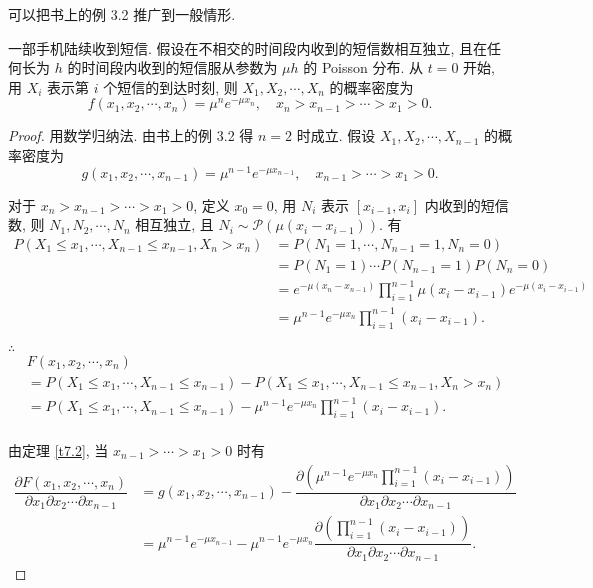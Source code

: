 \documentclass[color=black,device=normal,lang=cn]{elegantnote}
\numberwithin{equation}{section}
\theoremstyle{plain}
\numberwithin{exercise}{exsection}
\begin{document}
可以把书上的例 3.2 推广到一般情形.
\begin{example}\label{exa7.5}
    一部手机陆续收到短信. 假设在不相交的时间段内收到的短信数相互独立, 且在任何长为 $h$ 的时间段内收到的短信服从参数为 $\mu h$ 的 Poisson 分布. 从 $t=0$ 开始, 用 $X_i$ 表示第 $i$ 个短信的到达时刻, 则 $X_1,X_2,\cdots,X_n$ 的概率密度为
    \[f(x_1,x_2,\cdots,x_n)=\mu^ne^{-\mu x_n},\quad x_n>x_{n-1}>\cdots>x_1>0.\]
\end{example}
\begin{proof}
    用数学归纳法. 由书上的例 3.2 得 $n=2$ 时成立. 假设 $X_1,X_2,\cdots,X_{n-1}$ 的概率密度为
    \[g(x_1,x_2,\cdots,x_{n-1})=\mu^{n-1}e^{-\mu x_{n-1}},\quad x_{n-1}>\cdots>x_1>0.\]

    对于 $x_n>x_{n-1}>\cdots>x_1>0$, 定义 $x_0=0$, 用 $N_i$ 表示 $[x_{i-1},x_i]$ 内收到的短信数, 则 $N_1,N_2,\cdots,N_n$ 相互独立, 且 $N_i\sim\mathcal{P}(\mu(x_i-x_{i-1}))$. 有
    \begin{align*}
        P(X_1\leq x_1,\cdots,X_{n-1}\leq x_{n-1},X_n>x_n) & =P(N_1=1,\cdots,N_{n-1}=1,N_n=0) \\
        & =P(N_1=1)\cdots P(N_{n-1}=1)P(N_n=0) \\
        & =e^{-\mu(x_n-x_{n-1})}\prod\limits_{i=1}^{n-1}\mu(x_i-x_{i-1})e^{-\mu(x_i-x_{i-1})} \\
        & =\mu^{n-1}e^{-\mu x_n}\prod\limits_{i=1}^{n-1}(x_i-x_{i-1}).
    \end{align*}

    $\therefore$
    \begin{align*}
        & F(x_1,x_2,\cdots,x_n) \\
        & =P(X_1\leq x_1,\cdots,X_{n-1}\leq x_{n-1})-P(X_1\leq x_1,\cdots,X_{n-1}\leq x_{n-1},X_n>x_n) \\
        & =P(X_1\leq x_1,\cdots,X_{n-1}\leq x_{n-1})-\mu^{n-1}e^{-\mu x_n}\prod\limits_{i=1}^{n-1}(x_i-x_{i-1}). \\
    \end{align*}

    由定理 \ref{t7.2}, 当 $x_{n-1}>\cdots>x_1>0$ 时有
    \begin{align*}
        \dfrac{\partial F(x_1,x_2,\cdots,x_n)}{\partial x_1\partial x_2\cdots\partial x_{n-1}} & =g(x_1,x_2,\cdots,x_{n-1})-\dfrac{\partial\left(\mu^{n-1}e^{-\mu x_n}\prod\limits_{i=1}^{n-1}(x_i-x_{i-1})\right)}{\partial x_1\partial x_2\cdots\partial x_{n-1}} \\
        & =\mu^{n-1}e^{-\mu x_{n-1}}-\mu^{n-1}e^{-\mu x_n}\dfrac{\partial\left(\prod\limits_{i=1}^{n-1}(x_i-x_{i-1})\right)}{\partial x_1\partial x_2\cdots\partial x_{n-1}}.
    \end{align*}


\end{proof}
\end{document}
